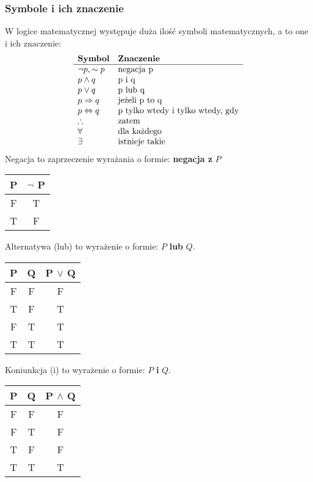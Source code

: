 \documentclass[12pt, a4paper]{article}
\begin{document}
\subsubsection*{Symbole i ich znaczenie}
W logice matematycznej występuje duża ilość symboli matematycznych, a to one i ich znaczenie:
$$
\begin{array}{l@{\quad}l}
  \textbf{Symbol} & \textbf{Znaczenie} \\
  \hline
  \neg p, \sim p & \text{negacja p} \\
  p \wedge q & \text{p i q} \\
  p \vee q & \text{p lub q} \\
  p \Rightarrow q & \text{jeżeli p to q} \\
  p \Leftrightarrow q & \text{p tylko wtedy i tylko wtedy, gdy} \\
  \therefore & \text{zatem} \\
  \forall & \text{dla każdego} \\
  \exists & \text{istnieje takie} \\
\end{array}
$$
Negacja to zaprzeczenie wyrażania o formie: \textbf{negacja z} $P$
\begin{center}
\begin{tabular}{c@{\quad}c}
\textbf{P} & $\neg$ \textbf{P} \\ \hline
F & T \\
T & F \\
\end{tabular}
\end{center}
Alternatywa (lub) to wyrażenie o formie: $P$ \textbf{lub} $Q$.\begin{center}
\begin{tabular}{c@{\quad}c@{\quad}c}
\textbf{P} & \textbf{Q} & \textbf{P} $\vee$ \textbf{Q} \\ \hline
F & F & F \\
T & F & T \\
F & T & T \\
T & T & T \\
\end{tabular}
\end{center}
Koniunkcja (i) to wyrażenie o formie: $P$ \textbf{i} $Q$.
\begin{center}
\begin{tabular}{c@{\quad}c@{\quad}c}
\textbf{P} & \textbf{Q} & \textbf{P} $\wedge$ \textbf{Q} \\ \hline
F & F & F \\
F & T & F \\
T & F & F \\
T & T & T \\
\end{tabular}
\end{center}
\end{document}
